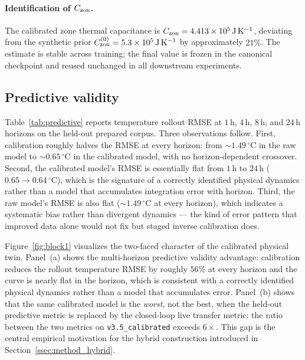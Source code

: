 \paragraph{Identification of $C_{\mathrm{zon}}$.}
The calibrated zone thermal capacitance is
$C_{\mathrm{zon}} = \SI{4.413e5}{\joule\per\kelvin}$, deviating from the synthetic prior
$C_{\mathrm{zon}}^{(0)} = \SI{5.3e5}{\joule\per\kelvin}$ by approximately $21\%$. The
estimate is stable across training; the final value is frozen in the
canonical checkpoint and reused unchanged in all downstream experiments.

\subsection{Predictive validity}
\label{ssec:res1_predictive}

Table~\ref{tab:predictive} reports temperature rollout RMSE at
$1\,\mathrm{h}$, $4\,\mathrm{h}$, $8\,\mathrm{h}$, and $24\,\mathrm{h}$
horizons on the held-out prepared corpus. Three observations follow.
First, calibration roughly halves the RMSE at every horizon: from
$\sim\!1.49\,^{\circ}\mathrm{C}$ in the raw model to
$\sim\!0.65\,^{\circ}\mathrm{C}$ in the calibrated model, with no
horizon-dependent crossover. Second, the calibrated model's RMSE is
essentially flat from $1\,\mathrm{h}$ to $24\,\mathrm{h}$
($0.65\to0.64\,^{\circ}\mathrm{C}$), which is the signature of a
correctly identified physical dynamics rather than a model that
accumulates integration error with horizon. Third, the raw model's
RMSE is also flat ($\sim\!1.49\,^{\circ}\mathrm{C}$ at every
horizon), which indicates a systematic bias rather than divergent
dynamics --- the kind of error pattern that improved data alone
would not fix but staged inverse calibration does.



Figure~\ref{fig:block1} visualizes the two-faced character of the
calibrated physical twin. Panel~(a) shows the multi-horizon predictive
validity advantage: calibration reduces the rollout temperature RMSE by
roughly $56\%$ at every horizon and the curve is nearly flat in the
horizon, which is consistent with a correctly identified physical
dynamics rather than a model that accumulates error. Panel~(b) shows
that the same calibrated model is the \emph{worst}, not the best, when
the held-out predictive metric is replaced by the closed-loop live
\boptest{} transfer metric: the ratio between the two metrics on
\texttt{v3.5\_calibrated} exceeds $6\times$. This gap is the central
empirical motivation for the hybrid construction introduced in
Section~\ref{ssec:method_hybrid}.

